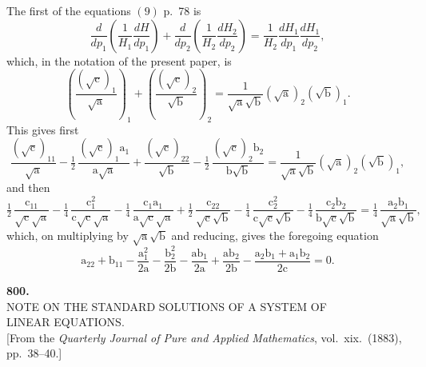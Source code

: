 \documentclass[11pt,a4paper]{article}
\begin{document}
\thispagestyle{plain}
\noindent The first of the equations $(9)$ p.~78 is
\[
\frac{d}{dp_{1}}\!\left(\frac{1}{H_{1}}\frac{dH}{dp_{1}}\right) + \frac{d}{dp_{2}}\!\left(\frac{1}{H_{2}}\frac{dH_{2}}{dp_{2}}\right) = \frac{1}{H_{2}}\frac{dH_{1}}{dp_{1}}\frac{dH_{1}}{dp_{2}},
\]
which, in the notation of the present paper, is
\[
\left(\frac{(\sqrt{\text{c}})_{1}}{\sqrt{\text{a}}}\right)_{\!1} + \left(\frac{(\sqrt{\text{c}})_{2}}{\sqrt{\text{b}}}\right)_{\!2} = \frac{1}{\sqrt{\text{a}}\sqrt{\text{b}}}(\sqrt{\text{a}})_{2}(\sqrt{\text{b}})_{1}.
\]
This gives first
\[
\frac{(\sqrt{\text{c}})_{11}}{\sqrt{\text{a}}} - \tfrac{1}{2}\,\frac{(\sqrt{\text{c}})_{1}\text{a}_{1}}{\text{a}\sqrt{\text{a}}} + \frac{(\sqrt{\text{c}})_{22}}{\sqrt{\text{b}}} - \tfrac{1}{2}\,\frac{(\sqrt{\text{c}})_{2}\text{b}_{2}}{\text{b}\sqrt{\text{b}}} = \frac{1}{\sqrt{\text{a}}\sqrt{\text{b}}}(\sqrt{\text{a}})_{2}(\sqrt{\text{b}})_{1},
\]
and then
\[
\tfrac{1}{2}\,\frac{\text{c}_{11}}{\sqrt{\text{c}}\sqrt{\text{a}}} - \tfrac{1}{4}\,\frac{\text{c}_{1}^{2}}{\text{c}\sqrt{\text{c}}\sqrt{\text{a}}} - \tfrac{1}{4}\,\frac{\text{c}_{1}\text{a}_{1}}{\text{a}\sqrt{\text{c}}\sqrt{\text{a}}} + \tfrac{1}{2}\,\frac{\text{c}_{22}}{\sqrt{\text{c}}\sqrt{\text{b}}} - \tfrac{1}{4}\,\frac{\text{c}_{2}^{2}}{\text{c}\sqrt{\text{c}}\sqrt{\text{b}}} - \tfrac{1}{4}\,\frac{\text{c}_{2}\text{b}_{2}}{\text{b}\sqrt{\text{c}}\sqrt{\text{b}}} = \tfrac{1}{4}\,\frac{\text{a}_{2}\text{b}_{1}}{\sqrt{\text{a}}\sqrt{\text{b}}},
\]
which, on multiplying by $\sqrt{\text{a}}\sqrt{\text{b}}$ and reducing, gives the foregoing equation
\[
\text{a}_{22} + \text{b}_{11} - \frac{\text{a}_{1}^{2}}{2\text{a}} - \frac{\text{b}_{2}^{2}}{2\text{b}} - \frac{\text{ab}_{1}}{2\text{a}} + \frac{\text{ab}_{2}}{2\text{b}} - \frac{\text{a}_{2}\text{b}_{1} + \text{a}_{1}\text{b}_{2}}{2\text{c}} = 0.
\]
\clearpage

\fancyhead[L]{\small 800]}
\fancyhead[C]{\small\ }

\thispagestyle{plain}
\begin{center}
\vspace*{2em}
{\Large\bfseries 800.}\\[1.5em]
{\normalsize\scshape NOTE ON THE STANDARD SOLUTIONS OF A SYSTEM OF}\\[0.3em]
{\normalsize\scshape LINEAR EQUATIONS.}\\[1em]
{\small [From the \textit{Quarterly Journal of Pure and Applied Mathematics}, vol.~xix.\ (1883), pp.~38--40.]}
\end{center}
\end{document}
